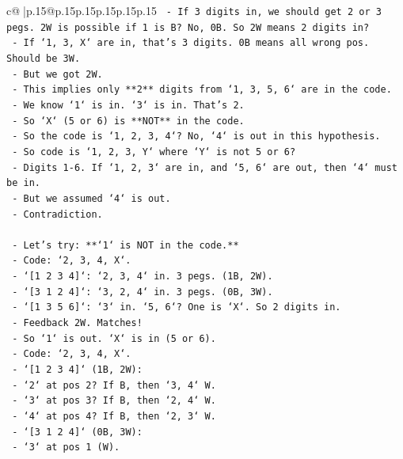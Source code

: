 \documentclass{article}
\begin{document}
{\begin{supertabular}{c@{$\;$}|p{.15\linewidth}@{}p{.15\linewidth}p{.15\linewidth}p{.15\linewidth}p{.15\linewidth}p{.15\linewidth}}
{{{\texttt{        {-} If 3 digits in, we should get 2 or 3 pegs. 2W is possible if 1 is B? No, 0B. So 2W means 2 digits in?} \\
\texttt{        {-} If `1, 3, X` are in, that's 3 digits. 0B means all wrong pos. Should be 3W.} \\
\texttt{        {-} But we got 2W.} \\
\texttt{        {-} This implies only **2** digits from `1, 3, 5, 6` are in the code.} \\
\texttt{        {-} We know `1` is in. `3` is in. That's 2.} \\
\texttt{        {-} So `X` (5 or 6) is **NOT** in the code.} \\
\texttt{        {-} So the code is `1, 2, 3, 4`? No, `4` is out in this hypothesis.} \\
\texttt{        {-} So code is `1, 2, 3, Y` where `Y` is not 5 or 6?} \\
\texttt{        {-} Digits 1{-}6. If `1, 2, 3` are in, and `5, 6` are out, then `4` must be in.} \\
\texttt{        {-} But we assumed `4` is out.} \\
\texttt{        {-} Contradiction.} \\
\\ 
\texttt{    {-} Let's try: **`1` is NOT in the code.**} \\
\texttt{    {-} Code: `2, 3, 4, X`.} \\
\texttt{    {-} `{[}1 2 3 4{]}`: `2, 3, 4` in. 3 pegs. (1B, 2W).} \\
\texttt{    {-} `{[}3 1 2 4{]}`: `3, 2, 4` in. 3 pegs. (0B, 3W).} \\
\texttt{    {-} `{[}1 3 5 6{]}`: `3` in. `5, 6`? One is `X`. So 2 digits in.} \\
\texttt{        {-} Feedback 2W. Matches!} \\
\texttt{    {-} So `1` is out. `X` is in (5 or 6).} \\
\texttt{    {-} Code: `2, 3, 4, X`.} \\
\texttt{    {-} `{[}1 2 3 4{]}` (1B, 2W):} \\
\texttt{        {-} `2` at pos 2? If B, then `3, 4` W.} \\
\texttt{        {-} `3` at pos 3? If B, then `2, 4` W.} \\
\texttt{        {-} `4` at pos 4? If B, then `2, 3` W.} \\
\texttt{    {-} `{[}3 1 2 4{]}` (0B, 3W):} \\
\texttt{        {-} `3` at pos 1 (W).} \\
}}}
\end{supertabular}}
\end{document}
